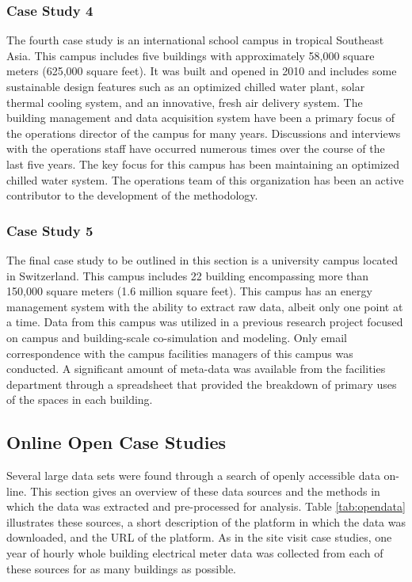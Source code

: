 \subsubsection{Case Study 4}
\label{sec:casestudy4}

The fourth case study is an international school campus in tropical Southeast Asia. This campus includes five buildings with approximately 58,000 square meters (625,000 square feet). It was built and opened in 2010 and includes some sustainable design features such as an optimized chilled water plant, solar thermal cooling system, and an innovative, fresh air delivery system. The building management and data acquisition system have been a primary focus of the operations director of the campus for many years. Discussions and interviews with the operations staff have occurred numerous times over the course of the last five years. The key focus for this campus has been maintaining an optimized chilled water system. The operations team of this organization has been an active contributor to the development of the methodology. 

\subsubsection{Case Study 5}
\label{sec:casestudy5}

The final case study to be outlined in this section is a university campus located in Switzerland. This campus includes 22 building encompassing more than 150,000 square meters (1.6 million square feet). This campus has an energy management system with the ability to extract raw data, albeit only one point at a time. Data from this campus was utilized in a previous research project focused on campus and building-scale co-simulation and modeling. Only email correspondence with the campus facilities managers of this campus was conducted. A significant amount of meta-data was available from the facilities department through a spreadsheet that provided the breakdown of primary uses of the spaces in each building.

\subsection{Online Open Case Studies}
\label{openonlinecasestudies}

Several large data sets were found through a search of openly accessible data on-line. This section gives an overview of these data sources and the methods in which the data was extracted and pre-processed for analysis. Table \ref{tab:opendata} illustrates these sources, a short description of the platform in which the data was downloaded, and the URL of the platform. As in the site visit case studies, one year of hourly whole building electrical meter data was collected from each of these sources for as many buildings as possible.


